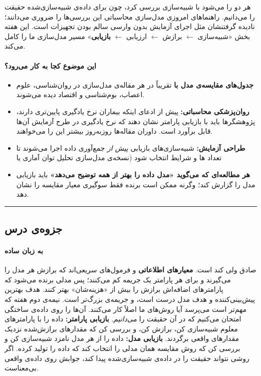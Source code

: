 هر دو را می‌شود با شبیه‌سازی بررسی کرد، چون برای داده‌ی شبیه‌سازی‌شده حقیقت
را می‌دانیم. راهنماهای امروزی مدل‌سازی محاسباتی این بررسی‌ها را ضروری
می‌دانند؛ نادیده گرفتنشان مثل اجرای آزمایش بدون وارسی سالم بودن تجهیزات
است. این هفته بخش «شبیه‌سازی \ensuremath{\leftarrow} برازش \ensuremath{\leftarrow} ارزیابی \ensuremath{\leftarrow} \textbf{بازیابی}» مسیر
مدل‌سازی ما را کامل می‌کند.

\paragraph{این موضوع کجا به کار می‌رود؟}

\begin{itemize}
\tightlist
\item
  \textbf{جدول‌های مقایسه‌ی مدل با } تقریباً در هر مقاله‌ی
  مدل‌سازی در روان‌شناسی، علوم اعصاب، بوم‌شناسی و اقتصاد دیده می‌شوند.
\item
  \textbf{روان‌پزشکی محاسباتی:} پیش از ادعای اینکه بیماران نرخ یادگیری
  پایین‌تری دارند، پژوهشگرها باید با بازیابی پارامتر نشان دهند که نرخ
  یادگیری در طرح آزمایش آن‌ها قابل برآورد است. داوران مقاله‌ها روزبه‌روز
  بیشتر این را می‌خواهند.
\item
  \textbf{طراحی آزمایش:} شبیه‌سازی‌های بازیابی \emph{پیش از} جمع‌آوری داده
  اجرا می‌شوند تا تعداد ها و شرایط انتخاب شود (نسخه‌ی مدل‌سازی
  تحلیل توان آماری یا 
\item
  \textbf{هر مطالعه‌ای که می‌گوید «مدل  داده را بهتر از همه توضیح
  می‌دهد»} باید بازیابی مدل را گزارش کند؛ وگرنه ممکن است برنده فقط سوگیری
  معیار مقایسه را نشان دهد.
\end{itemize}

\begin{center}\rule{0.5\linewidth}{0.5pt}\end{center}


\subsection{جزوه‌ی درس}

\paragraph{به زبان ساده}

 صادق ولی کند است. \textbf{معیارهای اطلاعاتی}
 و  فرمول‌های سریعی‌اند که برازش هر مدل را می‌گیرند و
برای هر پارامتر یک جریمه کم می‌کنند؛ پس مدلی برنده می‌شود که پارامترهای
اضافه‌اش برازش را بیش از «هزینه‌شان» بهتر کنند. هدف  بهترین
پیش‌بینی‌کننده و هدف  مدل درست است، و جریمه‌ی  بزرگ‌تر است.
نیمه‌ی دوم هفته که مهم‌تر است می‌پرسد آیا روش‌های ما اصلاً کار می‌کنند. آن‌ها
را روی داده‌ی ساختگی امتحان می‌کنیم که در آن حقیقت را \emph{می‌دانیم}.
\textbf{بازیابی پارامتر:} داده را با پارامترهای معلوم شبیه‌سازی کن، برازش
کن، و بررسی کن که مقدارهای برازش‌شده نزدیک مقدارهای واقعی برگردند.
\textbf{بازیابی مدل:} داده را از هر مدل نامزد شبیه‌سازی کن و بررسی کن که
روش مقایسه همان مدلی را انتخاب کند که داده را تولید کرده. اگر روشی
نتواند حقیقت را در داده‌ی شبیه‌سازی‌شده پیدا کند، جوابش روی داده‌ی واقعی
بی‌معناست.

